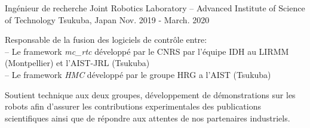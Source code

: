 
\begin{cventries}

  \cventry
    {Ingénieur de recherche} %
    {Joint Robotics Laboratory -- Advanced Institute of Science of Technology} %
    {Tsukuba, Japan} %
    {Nov. 2019 - March. 2020} %
    {
      \begin{cvitems} %
        \item Responsable de la fusion des logiciels de contrôle entre:\\
          -- Le framework \emph{mc\_rtc} développé par le CNRS par l'équipe IDH au LIRMM (Montpellier) et l'AIST-JRL (Tsukuba)\\
          -- Le framework \emph{HMC} développé par le groupe HRG a l'AIST (Tsukuba)
        \item Soutient technique aux deux groupes, développement de démonstrations sur les robots afin d'assurer les contributions experimentales des publications scientifiques ainsi que de répondre aux attentes de nos partenaires industriels.
      \end{cvitems}
    }


\end{cventries}
